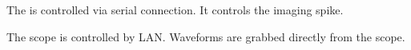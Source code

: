 The  is controlled via serial connection.  It controls the imaging spike.

The scope is controlled by LAN. Waveforms are grabbed directly from the scope.














